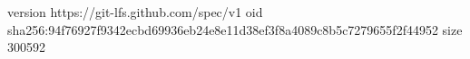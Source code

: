 version https://git-lfs.github.com/spec/v1
oid sha256:94f76927f9342ecbd69936eb24e8e11d38ef3f8a4089c8b5c7279655f2f44952
size 300592
